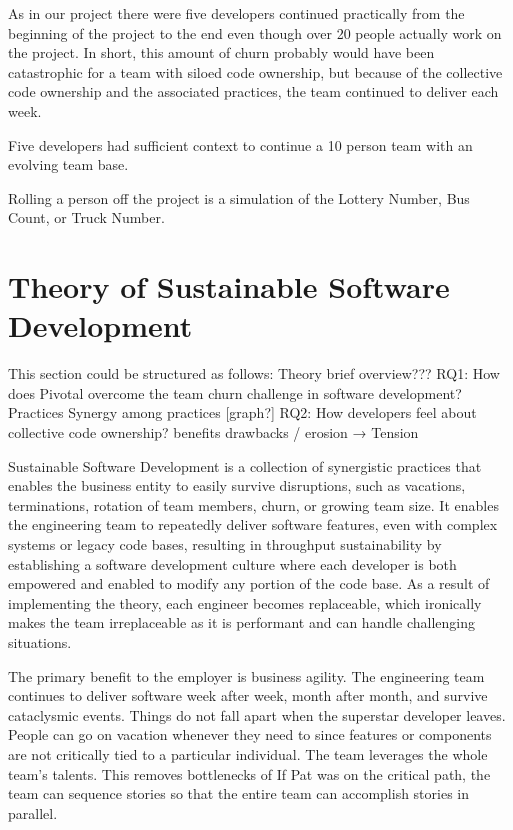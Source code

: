 As in our project there were five developers continued practically from the beginning of the project to the end even though over 20 people actually work on the project. In short, this amount of churn probably would have been catastrophic for a team with siloed code ownership, but because of the collective code  ownership and the associated practices, the team continued to deliver each week.

Five developers had sufficient context to continue a 10 person team with an evolving team base. 


Rolling a person off the project is a simulation of the Lottery Number, Bus Count, or Truck Number. 
\section{Theory of Sustainable Software Development}
This section could be structured as follows:
Theory brief overview???
RQ1: How does Pivotal overcome the team churn challenge in software development?
Practices
Synergy among practices [graph?]
RQ2: How developers feel about collective code ownership?
benefits
drawbacks / erosion
→ Tension

Sustainable Software Development is a collection of synergistic practices that enables the business entity to easily survive disruptions, such as vacations, terminations, rotation of team members, churn, or growing team size. It enables the engineering team to repeatedly deliver software features, even with complex systems or legacy code bases, resulting in throughput sustainability by establishing a software development culture where each developer is both empowered and enabled to modify any portion of the code base. As a result of implementing the theory, each engineer becomes replaceable, which ironically makes the team irreplaceable as it is performant and can handle challenging situations. 

The primary benefit to the employer is business agility. The engineering team continues to deliver software week after week, month after month, and survive cataclysmic events. Things do not fall apart when the superstar developer leaves. People can go on vacation whenever they need to since features or components are not critically tied to a particular individual. The team leverages the whole team's talents. This removes bottlenecks of  If Pat was on the critical path, the team can sequence stories so that the entire team can accomplish stories in parallel. 


